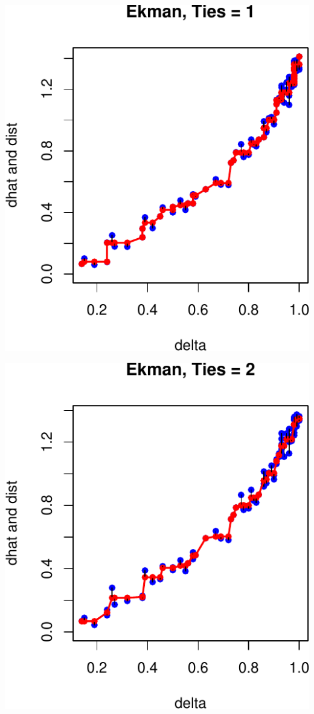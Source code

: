 \documentclass[
  12pt,
]{article}
\begin{document}
\begin{center}\includegraphics{smacofRO_files/figure-latex/plotekman-1} \end{center}

\begin{center}\includegraphics{smacofRO_files/figure-latex/plotekman-2} \end{center}
\end{document}

